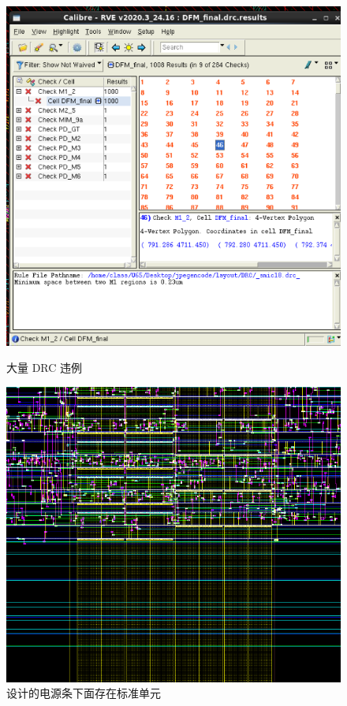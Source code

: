 \documentclass[12pt,hyperref,a4paper,UTF8]{ctexart}
\begin{document}
\begin{figure}[htbp]
    \centering
    \begin{minipage}{0.4\textwidth}
        \centering
        \includegraphics[width =1\textwidth]{figures/drc_multi_err.png}
        \caption{大量 DRC 违例}
        \label{drc_multi_err}
    \end{minipage}
    \quad
    \begin{minipage}{0.45\textwidth}
        \centering
        \includegraphics[width =1\textwidth]{figures/drc_multi_err_reason.png}
        \caption{设计的电源条下面存在标准单元}
        \label{drc_multi_err_reason}
    \end{minipage}
\end{figure}
\end{document}

